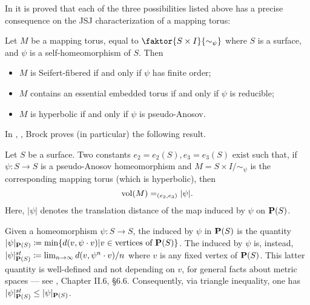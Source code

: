 In \cite{hyperbfibermfld} it is proved that each of the three possibilities listed above has a precise consequence on the JSJ characterization of a mapping torus:
\begin{theo}\label{thm:mappingtorushyperbolic}
Let $M$ be a mapping torus, equal to $\faktor{S\times I}{\sim_\psi}$ where $S$ is a surface, and $\psi$ is a self-homeomorphism of $S$. Then
\begin{itemize}
\item $M$ is Seifert-fibered if and only if $\psi$ has finite order;
\item $M$ contains an essential embedded torus if and only if $\psi$ is reducible;
\item $M$ is hyperbolic if and only if $\psi$ is pseudo-Anosov.
\end{itemize}
\end{theo}

In \cite{brock1}, \cite{brock2}, Brock proves (in particular) the following result.
\begin{theo}\label{thm:brockmappingtori}
Let $S$ be a surface. Two constants $e_2=e_2(S), e_3=e_3(S)$ exist such that, if $\psi:S\rightarrow S$ is a pseudo-Anosov homeomorphism and $M=S\times I/\sim_\psi$ is the corresponding mapping torus (which is hyperbolic), then
$$
\mathrm{vol}(M) =_{(e_2,e_3)} |\psi|.
$$
Here, $|\psi|$ denotes the translation distance of the map induced by $\psi$ on $\mathbf P(S)$.
\end{theo}

Given a homeomorphism $\psi:S\rightarrow S$, the  induced by $\psi$ in $\mathbf P(S)$ is the quantity $|\psi|_{\mathbf P(S)}\coloneqq\min \{d(v,\psi\cdot v)|v\in\text{vertices of }\mathbf P(S)\}$. The  induced by $\psi$ is, instead, $|\psi|_{\mathbf P(S)}^{st}\coloneqq\lim_{n\rightarrow\infty} d(v,\psi^n\cdot v)/n$ where $v$ is any fixed vertex of $\mathbf P(S)$. This latter quantity is well-defined and not depending on $v$, for general facts about metric spaces --- see \cite{bridson}, Chapter II.6, \S 6.6. Consequently, via triangle inequality,  one has $|\psi|_{\mathbf P(S)}^{st}\leq |\psi|_{\mathbf P(S)}$.

